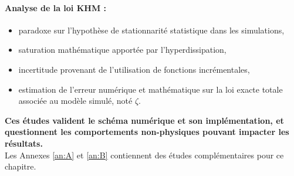 {\begin{minipage}[c]{\linewidth}
 \paragraph{Analyse de la loi KHM : }
 \begin{itemize}
     \item paradoxe sur l'hypothèse de stationnarité statistique dans les simulations,
     \item saturation mathématique apportée par l'hyperdissipation,
     \item incertitude provenant de l'utilisation de fonctions incrémentales,
     \item estimation de l'erreur numérique et mathématique sur la loi exacte totale associée au modèle simulé, noté $\zeta$. \\
 \end{itemize}
 
 {\bf Ces études valident le schéma numérique et son implémentation, et questionnent les comportements non-physiques pouvant impacter les résultats.} \\
 
 Les Annexes \ref{an:A} et \ref{an:B} contiennent des études complémentaires pour ce chapitre.
 \end{minipage}}
